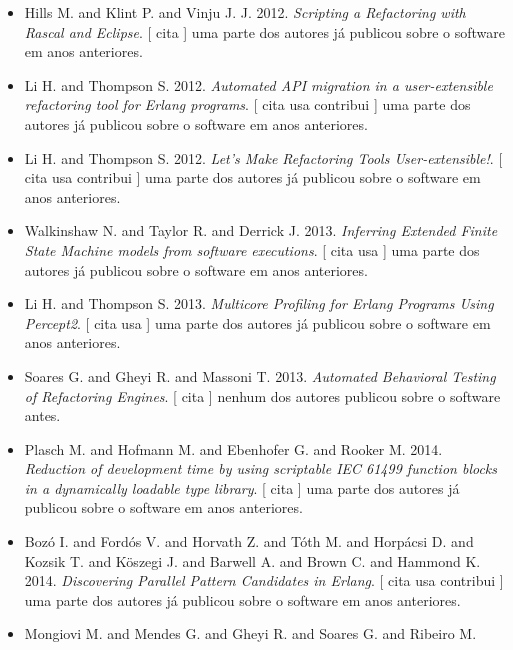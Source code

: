 \begin{itemize}
      [
          cita
      ]
uma parte dos autores já publicou sobre o software em anos anteriores.
\item Hills M. and Klint P. and Vinju J. J.
      2012.
        \textit{ Scripting a Refactoring with Rascal and Eclipse}.
      [
          cita
      ]
uma parte dos autores já publicou sobre o software em anos anteriores.
\item Li H. and Thompson S.
      2012.
        \textit{ Automated API migration in a user-extensible refactoring tool for Erlang programs}.
      [
          cita
          usa
          contribui
      ]
uma parte dos autores já publicou sobre o software em anos anteriores.
\item Li H. and Thompson S.
      2012.
        \textit{ Let's Make Refactoring Tools User-extensible!}.
      [
          cita
          usa
          contribui
      ]
uma parte dos autores já publicou sobre o software em anos anteriores.
\item Walkinshaw N. and Taylor R. and Derrick J.
      2013.
        \textit{ Inferring Extended Finite State Machine models from software executions}.
      [
          cita
          usa
      ]
uma parte dos autores já publicou sobre o software em anos anteriores.
\item Li H. and Thompson S.
      2013.
        \textit{ Multicore Profiling for Erlang Programs Using Percept2}.
      [
          cita
          usa
      ]
uma parte dos autores já publicou sobre o software em anos anteriores.
\item Soares G. and Gheyi R. and Massoni T.
      2013.
        \textit{ Automated Behavioral Testing of Refactoring Engines}.
      [
          cita
      ]
nenhum dos autores publicou sobre o software antes.
\item Plasch M. and Hofmann M. and Ebenhofer G. and Rooker M.
      2014.
        \textit{ Reduction of development time by using scriptable IEC 61499 function blocks in a dynamically loadable type library}.
      [
          cita
      ]
uma parte dos autores já publicou sobre o software em anos anteriores.
\item Boz\'{o} I. and Ford\'{o}s V. and Horvath Z. and T\'{o}th M. and Horp\'{a}csi D. and Kozsik T. and K\"{o}szegi J. and Barwell A. and Brown C. and Hammond K.
      2014.
        \textit{ Discovering Parallel Pattern Candidates in Erlang}.
      [
          cita
          usa
          contribui
      ]
uma parte dos autores já publicou sobre o software em anos anteriores.
\item Mongiovi M. and Mendes G. and Gheyi R. and Soares G. and Ribeiro M.

\end{itemize}
